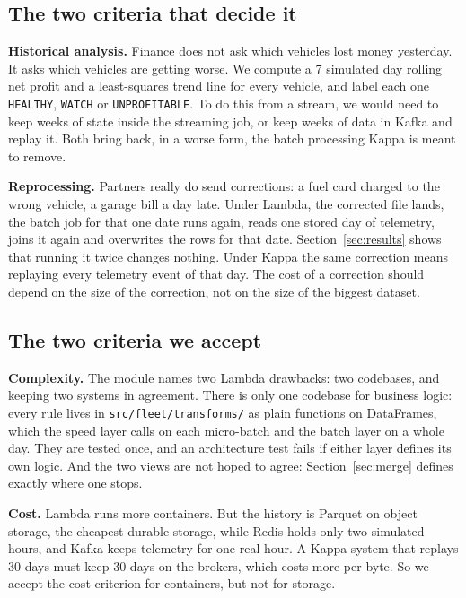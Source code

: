 \documentclass[11pt,a4paper]{article}
\begin{document}
\subsection{The two criteria that decide it}

\textbf{Historical analysis.} Finance does not ask which vehicles lost money yesterday.
It asks which vehicles are getting worse. We compute a 7 simulated day rolling net
profit and a least-squares trend line for every vehicle, and label each one
\texttt{HEALTHY}, \texttt{WATCH} or \texttt{UNPROFITABLE}. To do this from a stream, we
would need to keep weeks of state inside the streaming job, or keep weeks of data in
Kafka and replay it. Both bring back, in a worse form, the batch processing Kappa is
meant to remove.

\textbf{Reprocessing.} Partners really do send corrections: a fuel card charged to the
wrong vehicle, a garage bill a day late. Under Lambda, the corrected file lands, the
batch job for that one date runs again, reads one stored day of telemetry, joins it
again and overwrites the rows for that date. Section~\ref{sec:results} shows that
running it twice changes nothing. Under Kappa the same correction means replaying every
telemetry event of that day. The cost of a correction should depend on the size of the
correction, not on the size of the biggest dataset.

\subsection{The two criteria we accept}

\textbf{Complexity.} The module names two Lambda drawbacks: two codebases, and keeping
two systems in agreement. There is only one codebase for business logic: every rule
lives in \texttt{src/fleet/transforms/} as plain functions on DataFrames, which the speed
layer calls on each micro-batch and the batch layer on a whole day. They are tested once,
and an architecture test fails if either layer defines its own logic. And the two views
are not hoped to agree: Section~\ref{sec:merge} defines exactly where one stops.

\textbf{Cost.} Lambda runs more containers. But the history is Parquet on object
storage, the cheapest durable storage, while Redis holds only two simulated hours, and
Kafka keeps telemetry for one real hour. A Kappa system that replays 30 days must keep 30
days on the brokers, which costs more per byte. So we accept the cost criterion for
containers, but not for storage.
\end{document}
